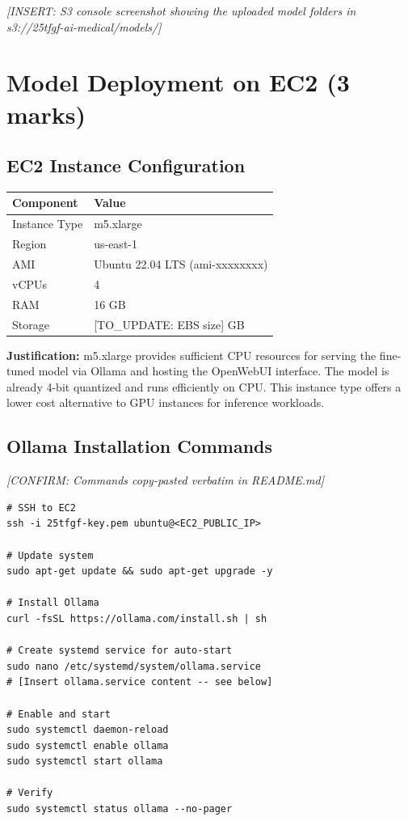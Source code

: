 \documentclass[11pt,a4paper]{article}
\begin{document}
\textit{[INSERT: S3 console screenshot showing the uploaded model folders in s3://25tfgf-ai-medical/models/]}

\section{Model Deployment on EC2 (3 marks)}

\subsection{EC2 Instance Configuration}

\begin{table}[H]
\centering
\begin{tabular}{@{}ll@{}}
\toprule
\textbf{Component} & \textbf{Value} \\
\midrule
Instance Type & m5.xlarge \\
Region & us-east-1 \\
AMI & Ubuntu 22.04 LTS (ami-xxxxxxxx) \\
vCPUs & 4 \\
RAM & 16 GB \\
Storage & [TO\_UPDATE: EBS size] GB \\
\bottomrule
\end{tabular}
\end{table}

\textbf{Justification:} m5.xlarge provides sufficient CPU resources for serving the fine-tuned model via Ollama and hosting the OpenWebUI interface. The model is already 4-bit quantized and runs efficiently on CPU. This instance type offers a lower cost alternative to GPU instances for inference workloads.

\subsection{Ollama Installation Commands}

\textit{[CONFIRM: Commands copy-pasted verbatim in README.md]}

\begin{lstlisting}[style=bash]
# SSH to EC2
ssh -i 25tfgf-key.pem ubuntu@<EC2_PUBLIC_IP>

# Update system
sudo apt-get update && sudo apt-get upgrade -y

# Install Ollama
curl -fsSL https://ollama.com/install.sh | sh

# Create systemd service for auto-start
sudo nano /etc/systemd/system/ollama.service
# [Insert ollama.service content -- see below]

# Enable and start
sudo systemctl daemon-reload
sudo systemctl enable ollama
sudo systemctl start ollama

# Verify
sudo systemctl status ollama --no-pager
\end{lstlisting}
\end{document}
